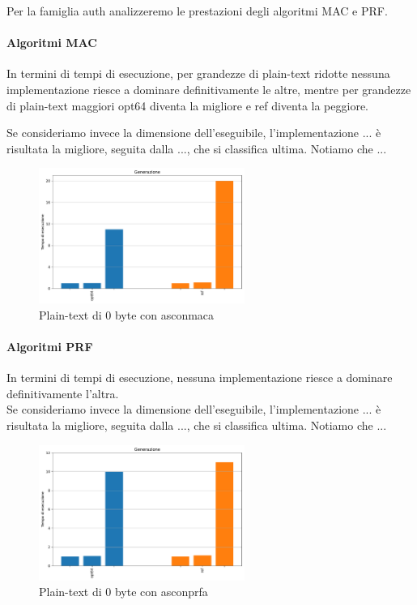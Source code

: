 \documentclass[12pt,a4paper,italian]{report}
\begin{document}
Per la famiglia auth analizzeremo le prestazioni degli algoritmi MAC e PRF.

\paragraph{Algoritmi MAC}

In termini di tempi di esecuzione, per grandezze di plain-text ridotte nessuna implementazione riesce a dominare definitivamente le altre, mentre per grandezze di plain-text maggiori opt64 diventa la migliore e ref diventa la peggiore.

\noindent Se consideriamo invece la dimensione dell'eseguibile, l'implementazione ...  è risultata la migliore, seguita dalla ..., che si classifica ultima. Notiamo che ...

\begin{figure}[H]
    \centering
    \includegraphics[width=0.6\textwidth]{raspberry/asconmaca.pdf}
    \caption{Plain-text di 0 byte con asconmaca}
\end{figure}

\paragraph{Algoritmi PRF}

In termini di tempi di esecuzione, nessuna implementazione riesce a dominare definitivamente l'altra. \\

\noindent Se consideriamo invece la dimensione dell'eseguibile, l'implementazione ...  è risultata la migliore, seguita dalla ..., che si classifica ultima. Notiamo che ...

\begin{figure}[H]
    \centering
    \includegraphics[width=0.6\textwidth]{raspberry/asconprfa.pdf}
    \caption{Plain-text di 0 byte con asconprfa}
\end{figure}
\end{document}
